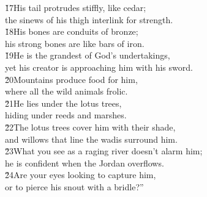 \begin{poetry}
\poeml \v{17}His tail protrudes stiffly, like cedar; \\
\poemll    the sinews of his thigh interlink for strength. \\
\poeml \v{18}His bones are conduits of bronze; \\
\poemll    his strong bones are like bars of iron. \\
\poeml \v{19}He is the grandest of God's undertakings, \\
\poemll    yet his creator is approaching him with his sword. \\
\poeml \v{20}Mountains produce food for him, \\
\poemll    where all the wild animals frolic. \\
\poeml \v{21}He lies under the lotus trees, \\
\poemll    hiding under reeds and marshes. \\
\poeml \v{22}The lotus trees cover him with their shade, \\
\poemll    and willows that line the wadis surround him. \\
\poeml \v{23}What you see as a raging river doesn't alarm him; \\
\poemll    he is confident when the Jordan overflows. \\
\poeml \v{24}Are your eyes looking to capture him, \\
\poemll    or to pierce his snout with a bridle?''
\end{poetry}

